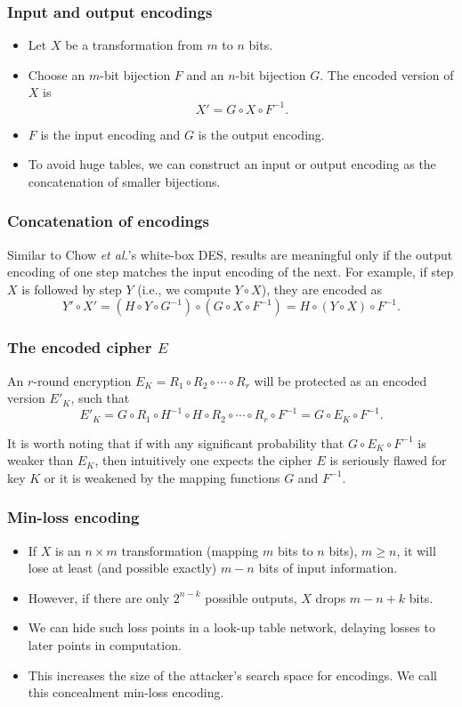 \documentclass{beamer}
\begin{document}
\frame
{
\frametitle{Input and output encodings}
\begin{itemize}
\item Let $X$ be a transformation from $m$ to $n$ bits.
\item Choose an $m$-bit bijection $F$ and an $n$-bit bijection $G$. The encoded version of $X$ is
  \[X' = G \circ X \circ F^{-1}.\]
\item $F$ is \textcolor[rgb]{1.00,0.00,0.00}{the input encoding} and $G$ is \textcolor[rgb]{1.00,0.00,0.00}{the output encoding}.
\item To avoid huge tables, we can construct an input or output encoding as the concatenation of smaller bijections.
\end{itemize}
}

\frame
{
\frametitle{Concatenation of encodings}
Similar to Chow \textit{et al.}'s white-box DES, results are meaningful only if the output encoding of one step matches the input encoding of the next. For example, if step $X$ is followed by step $Y$ (i.e., we compute $Y \circ X$), they are encoded as
\[Y' \circ X' = (H \circ Y \circ G^{-1}) \circ (G \circ X \circ F^{-1}) = H \circ (Y \circ X) \circ F^{-1}.\]

}

\frame
{
\frametitle{The encoded cipher $E$}
An $r$-round encryption $E_{K}=R_{1}\circ R_{2} \circ \cdots \circ R_{r}$ will be protected as an encoded version $E'_{K}$, such that
\[E'_{K}= G \circ R_{1} \circ H^{-1} \circ H \circ R_{2} \circ \cdots \circ R_{r} \circ F^{-1}=G \circ E_{K} \circ F^{-1}.\]

It is worth noting that if with any significant probability that $G \circ E_{K} \circ F^{-1}$ is weaker than $E_{K}$, then intuitively one expects the cipher $E$ is seriously flawed for key $K$ or it is weakened by the mapping functions $G$ and $F^{-1}$.
}

\frame
{
\frametitle{Min-loss encoding}
\begin{itemize}
\item If $X$ is an $n \times m$ transformation (mapping $m$ bits to $n$ bits), $m \geq n$, it will lose at least (and possible exactly) $m - n$ bits of input information.

\item However, if there are only $2^{n-k}$ possible outputs, $X$ drops $m-n+k$ bits.

\item We can hide such loss points in a look-up table network, delaying losses to later points in computation.

\item This increases the size of the attacker's search space for encodings. We call this concealment \textcolor[rgb]{1.00,0.00,0.00}{min-loss encoding}.
\end{itemize}
}
\end{document}
